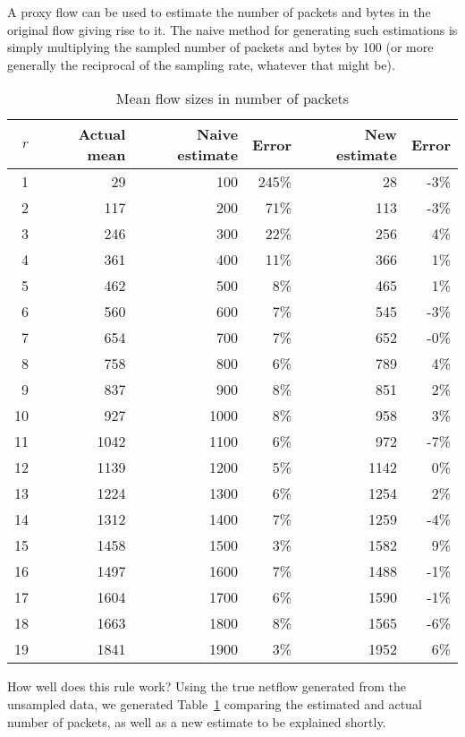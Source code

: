 \documentclass{paper}
\begin{document}
A proxy flow can be used to estimate the number of packets and bytes in the
original flow giving rise to it. The naive method for generating such
estimations is simply multiplying the sampled number of packets and bytes by 100
(or more generally the reciprocal of the sampling rate, whatever that might be).

\begin{table}
\begin{center}
\begin{tabular}{r r r r r r}
$r$ & Actual mean & Naive estimate & Error & New estimate & Error \\
\midrule
 1 &   29 &  100 & 245\% &   28 & -3\% \\
 2 &  117 &  200 &  71\% &  113 & -3\% \\
 3 &  246 &  300 &  22\% &  256 &  4\% \\
 4 &  361 &  400 &  11\% &  366 &  1\% \\
 5 &  462 &  500 &   8\% &  465 &  1\% \\
 6 &  560 &  600 &   7\% &  545 & -3\% \\
 7 &  654 &  700 &   7\% &  652 & -0\% \\
 8 &  758 &  800 &   6\% &  789 &  4\% \\
 9 &  837 &  900 &   8\% &  851 &  2\% \\
10 &  927 & 1000 &   8\% &  958 &  3\% \\
11 & 1042 & 1100 &   6\% &  972 & -7\% \\
12 & 1139 & 1200 &   5\% & 1142 &  0\% \\
13 & 1224 & 1300 &   6\% & 1254 &  2\% \\
14 & 1312 & 1400 &   7\% & 1259 & -4\% \\
15 & 1458 & 1500 &   3\% & 1582 &  9\% \\
16 & 1497 & 1600 &   7\% & 1488 & -1\% \\
17 & 1604 & 1700 &   6\% & 1590 & -1\% \\
18 & 1663 & 1800 &   8\% & 1565 & -6\% \\
19 & 1841 & 1900 &   3\% & 1952 &  6\% \\
\end{tabular}
\caption{Mean flow sizes in number of packets}
\label{mean_flow_size}
\end{center}
\end{table}

How well does this rule work? Using the true netflow generated from the
unsampled data, we generated Table~\ref{mean_flow_size} comparing the estimated
and actual number of packets, as well as a new estimate to be explained shortly.
\end{document}
